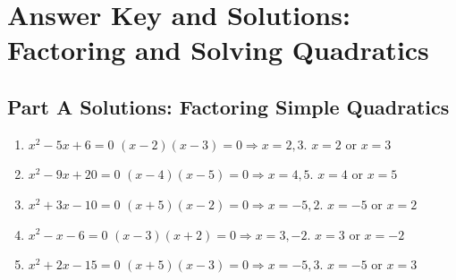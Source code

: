 \documentclass[14pt]{extarticle}
\begin{document}

\section*{Answer Key and Solutions: Factoring and Solving Quadratics}

\subsection*{Part A Solutions: Factoring Simple Quadratics}
\begin{enumerate}
  \item \(x^2 - 5x + 6 = 0\)  
  \((x - 2)(x - 3) = 0 \Rightarrow x = 2, 3.\)  
  \(\boxed{x = 2 \text{ or } x = 3}\)

  \item \(x^2 - 9x + 20 = 0\)  
  \((x - 4)(x - 5) = 0 \Rightarrow x = 4, 5.\)  
  \(\boxed{x = 4 \text{ or } x = 5}\)

  \item \(x^2 + 3x - 10 = 0\)  
  \((x + 5)(x - 2) = 0 \Rightarrow x = -5, 2.\)  
  \(\boxed{x = -5 \text{ or } x = 2}\)

  \item \(x^2 - x - 6 = 0\)  
  \((x - 3)(x + 2) = 0 \Rightarrow x = 3, -2.\)  
  \(\boxed{x = 3 \text{ or } x = -2}\)

  \item \(x^2 + 2x - 15 = 0\)  
  \((x + 5)(x - 3) = 0 \Rightarrow x = -5, 3.\)  
  \(\boxed{x = -5 \text{ or } x = 3}\)
\end{enumerate}
\end{document}
